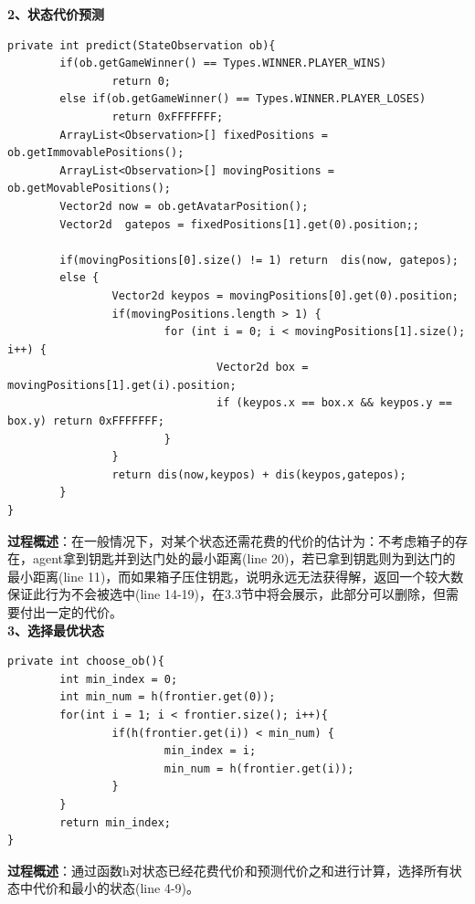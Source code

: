 \documentclass[UTF8]{article}
\begin{document}
\indent\textbf{2、状态代价预测}
\begin{lstlisting}[caption=状态代价预测]
private int predict(StateObservation ob){ 
		if(ob.getGameWinner() == Types.WINNER.PLAYER_WINS) 
				return 0;
		else if(ob.getGameWinner() == Types.WINNER.PLAYER_LOSES) 
				return 0xFFFFFFF;
		ArrayList<Observation>[] fixedPositions = ob.getImmovablePositions();
		ArrayList<Observation>[] movingPositions = ob.getMovablePositions();
		Vector2d now = ob.getAvatarPosition();
		Vector2d  gatepos = fixedPositions[1].get(0).position;;
		
		if(movingPositions[0].size() != 1) return  dis(now, gatepos);
		else {
				Vector2d keypos = movingPositions[0].get(0).position;
				if(movingPositions.length > 1) {
						for (int i = 0; i < movingPositions[1].size(); i++) {
								Vector2d box = movingPositions[1].get(i).position;
								if (keypos.x == box.x && keypos.y == box.y) return 0xFFFFFFF;
						}
				}
				return dis(now,keypos) + dis(keypos,gatepos);
		}
}
\end{lstlisting}
\indent\textbf{过程概述}：在一般情况下，对某个状态还需花费的代价的估计为：不考虑箱子的存在，agent拿到钥匙并到达门处的最小距离(line 20)，若已拿到钥匙则为到达门的最小距离(line 11)，而如果箱子压住钥匙，说明永远无法获得解，返回一个较大数保证此行为不会被选中(line 14-19)，在3.3节中将会展示，此部分可以删除，但需要付出一定的代价。\\ 

\indent\textbf{3、选择最优状态}
\begin{lstlisting}[caption=选择最优状态]
private int choose_ob(){
		int min_index = 0;
		int min_num = h(frontier.get(0));
		for(int i = 1; i < frontier.size(); i++){
				if(h(frontier.get(i)) < min_num) {
						min_index = i;
						min_num = h(frontier.get(i));
				}
		}
		return min_index;
}
\end{lstlisting}
\indent\textbf{过程概述}：通过函数h对状态已经花费代价和预测代价之和进行计算，选择所有状态中代价和最小的状态(line 4-9)。\\
\end{document}
